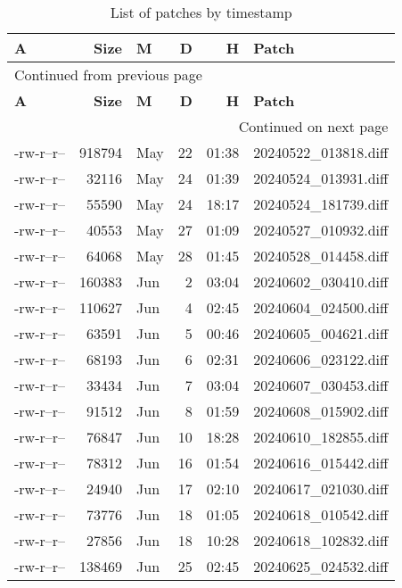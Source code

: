 \documentclass[a4paper]{article}
\begin{document}
\begin{longtable}{lrlrrl}
\caption{List of patches by timestamp}
\\[0pt]
\textbf{A} & \textbf{Size} & \textbf{M} & \textbf{D} & \textbf{H} & \textbf{Patch}\\[0pt]
\hline
\endfirsthead
\multicolumn{6}{l}{Continued from previous page} \\[0pt]
\hline

\textbf{A} & \textbf{Size} & \textbf{M} & \textbf{D} & \textbf{H} & \textbf{Patch} \\[0pt]

\hline
\endhead
\hline\multicolumn{6}{r}{Continued on next page} \\
\endfoot
\endlastfoot
\hline
-rw-r--r-- & 918794 & May & 22 & 01:38 & 20240522\_013818.diff\\[0pt]
-rw-r--r-- & 32116 & May & 24 & 01:39 & 20240524\_013931.diff\\[0pt]
-rw-r--r-- & 55590 & May & 24 & 18:17 & 20240524\_181739.diff\\[0pt]
-rw-r--r-- & 40553 & May & 27 & 01:09 & 20240527\_010932.diff\\[0pt]
-rw-r--r-- & 64068 & May & 28 & 01:45 & 20240528\_014458.diff\\[0pt]
-rw-r--r-- & 160383 & Jun & 2 & 03:04 & 20240602\_030410.diff\\[0pt]
-rw-r--r-- & 110627 & Jun & 4 & 02:45 & 20240604\_024500.diff\\[0pt]
-rw-r--r-- & 63591 & Jun & 5 & 00:46 & 20240605\_004621.diff\\[0pt]
-rw-r--r-- & 68193 & Jun & 6 & 02:31 & 20240606\_023122.diff\\[0pt]
-rw-r--r-- & 33434 & Jun & 7 & 03:04 & 20240607\_030453.diff\\[0pt]
-rw-r--r-- & 91512 & Jun & 8 & 01:59 & 20240608\_015902.diff\\[0pt]
-rw-r--r-- & 76847 & Jun & 10 & 18:28 & 20240610\_182855.diff\\[0pt]
-rw-r--r-- & 78312 & Jun & 16 & 01:54 & 20240616\_015442.diff\\[0pt]
-rw-r--r-- & 24940 & Jun & 17 & 02:10 & 20240617\_021030.diff\\[0pt]
-rw-r--r-- & 73776 & Jun & 18 & 01:05 & 20240618\_010542.diff\\[0pt]
-rw-r--r-- & 27856 & Jun & 18 & 10:28 & 20240618\_102832.diff\\[0pt]
-rw-r--r-- & 138469 & Jun & 25 & 02:45 & 20240625\_024532.diff\\[0pt]

\end{longtable}
\end{document}

